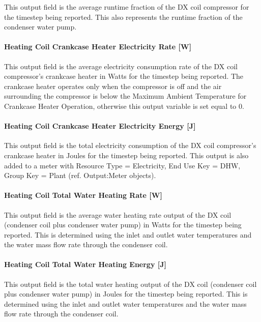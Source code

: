This output field is the average runtime fraction of the DX coil compressor for the timestep being reported. This also represents the runtime fraction of the condenser water pump.

\paragraph{Heating Coil Crankcase Heater Electricity Rate {[}W{]}}\label{heating-coil-crankcase-heater-electric-powerw-1}

This output field is the average electricity consumption rate of the DX coil compressor's crankcase heater in Watts for the timestep being reported. The crankcase heater operates only when the compressor is off and the air surrounding the compressor is below the Maximum Ambient Temperature for Crankcase Heater Operation, otherwise this output variable is set equal to 0.

\paragraph{Heating Coil Crankcase Heater Electricity Energy {[}J{]}}\label{heating-coil-crankcase-heater-electric-energy-j-2}

This output field is the total electricity consumption of the DX coil compressor's crankcase heater in Joules for the timestep being reported. This output is also added to a meter with Resource Type = Electricity, End Use Key = DHW, Group Key = Plant (ref. Output:Meter objects).

\paragraph{Heating Coil Total Water Heating Rate {[}W{]}}\label{heating-coil-total-water-heating-rate-w}

This output field is the average water heating rate output of the DX coil (condenser coil plus condenser water pump) in Watts for the timestep being reported. This is determined using the inlet and outlet water temperatures and the water mass flow rate through the condenser coil.

\paragraph{Heating Coil Total Water Heating Energy {[}J{]}}\label{heating-coil-total-water-heating-energy-j}

This output field is the total water heating output of the DX coil (condenser coil plus condenser water pump) in Joules for the timestep being reported. This is determined using the inlet and outlet water temperatures and the water mass flow rate through the condenser coil.

